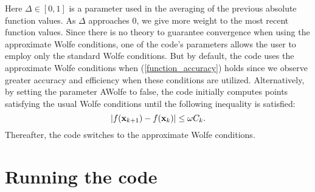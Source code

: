 \documentclass [12pt] {article}
\newcommand{\m}[1]{{\bf{#1}}}
\begin{document}
Here $\Delta \in [0,1]$ is a parameter used in the averaging of the
previous absolute function values.
As $\Delta$ approaches 0, we give more weight to the most recent function
values.
Since there is no theory to guarantee convergence when using the
approximate Wolfe conditions, one of the code's parameters allows
the user to employ only the standard Wolfe conditions.
But by default, the code uses the approximate Wolfe conditions when
(\ref{function_accuracy}) holds since we observe
greater accuracy and efficiency when these conditions are utilized.
Alternatively, by setting the parameter {\sc AWolfe} to false,
the code initially computes points satisfying the usual Wolfe conditions
until the following inequality is satisfied:
%
\begin{equation}\label{omega}
|f(\m{x}_{k+1}) - f(\m{x}_{k})| \le \omega C_k .
\end{equation}
%
Thereafter, the code switches to the approximate Wolfe conditions.
\section{Running the code}
\end{document}
